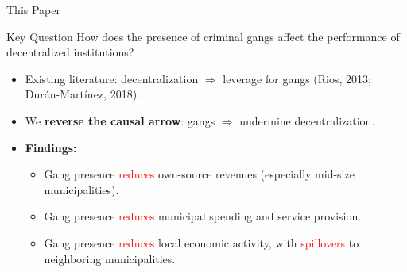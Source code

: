\documentclass[10pt, hyperref={pdfpagelabels=false}]{beamer}
\begin{document}
\begin{frame}{This Paper}

\begin{block}{Key Question}
How does the presence of criminal gangs affect the performance of decentralized institutions?
\end{block}

\pause

\begin{itemize}

\item Existing literature: decentralization $\Rightarrow$ leverage for gangs (Rios, 2013; Dur\'an-Mart\'inez, 2018).

\item We \textcolor{myblue}{\textbf{reverse the causal arrow}}: gangs $\Rightarrow$ undermine decentralization.

\pause

\item \textbf{Findings:}
\begin{itemize}
\item Gang presence \textcolor{red}{reduces} own-source revenues (especially mid-size municipalities).
\item Gang presence \textcolor{red}{reduces} municipal spending and service provision.
\item Gang presence \textcolor{red}{reduces} local economic activity, with \textcolor{red}{spillovers} to neighboring municipalities.
\end{itemize}

\end{itemize}
\end{frame}
\end{document}

